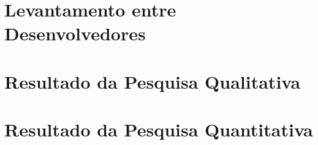 \documentclass[
	msc,portugues
]{../ppgccufmg}
\begin{document}
			
		\renewcommand\bibname{References} %
		
		
		
		\begin{apendices}
            \chapter{Levantamento entre Desenvolvedores}
            \label{appendix:survey_questions}
            
            \chapter{Resultado da Pesquisa Qualitativa}
            \label{appendix:results_qual}
            
                \chapter{Resultado da Pesquisa Quantitativa}    \label{appendix:results_quant}
            
		\end{apendices}
		
\end{document}
